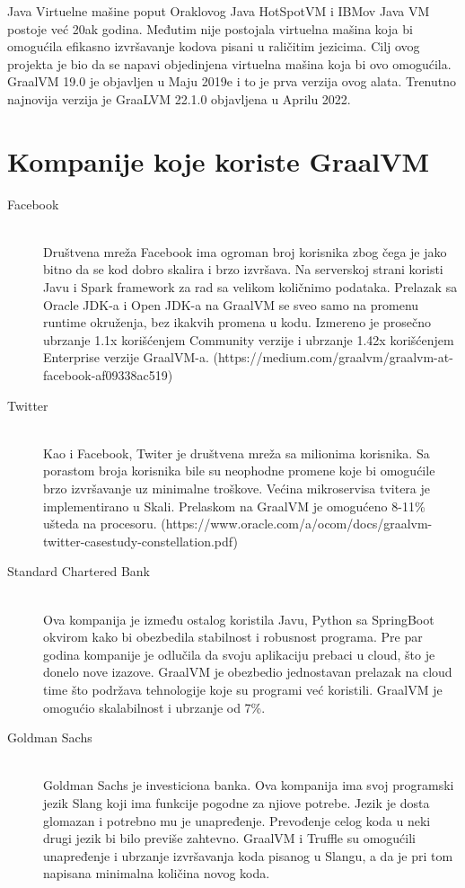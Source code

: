 \documentclass[a4paper]{article}
\begin{document}
Java Virtuelne mašine poput Oraklovog Java HotSpotVM i IBMov Java VM postoje već 20ak godina. Međutim nije postojala virtuelna mašina koja bi omogućila efikasno izvršavanje kodova pisani u raličitim jezicima. Cilj ovog projekta je bio da se napavi objedinjena virtuelna mašina koja bi ovo omogućila.\\

GraalVM 19.0 je objavljen u Maju 2019e i to je prva verzija ovog alata. Trenutno najnovija verzija je GraaLVM 22.1.0 objavljena u Aprilu 2022. 


\section{Kompanije koje koriste GraalVM}
\begin{description}
	\item[Facebook] \hfill \\
	Društvena mreža Facebook ima ogroman broj korisnika zbog čega je jako bitno da se kod dobro skalira i brzo izvršava.
	Na serverskoj strani koristi Javu i Spark framework za rad sa velikom količnimo podataka. Prelazak sa Oracle JDK-a i Open JDK-a na GraalVM se sveo samo na promenu runtime okruženja, bez ikakvih promena u kodu. Izmereno je prosečno ubrzanje 1.1x korišćenjem Community verzije i ubrzanje 1.42x korišćenjem Enterprise verzije GraalVM-a.  (https://medium.com/graalvm/graalvm-at-facebook-af09338ac519)
	
	\item[Twitter] \hfill \\
	Kao i Facebook, Twiter je društvena mreža sa milionima korisnika. Sa porastom broja korisnika bile su neophodne promene koje bi omogućile brzo izvršavanje uz minimalne troškove. Većina mikroservisa tvitera je implementirano u Skali. Prelaskom na GraalVM je omogućeno 8-11\% ušteda na procesoru. 
	(https://www.oracle.com/a/ocom/docs/graalvm-twitter-casestudy-constellation.pdf)
	
	\item[Standard Chartered Bank] \hfil \\
	Ova kompanija je između ostalog koristila Javu, Python sa SpringBoot okvirom kako bi obezbedila stabilnost i robusnost programa. Pre par godina kompanije je odlučila da svoju aplikaciju prebaci u cloud, što je donelo nove izazove. GraalVM je obezbedio jednostavan prelazak na cloud time što podržava tehnologije koje su programi već koristili. GraalVM je omogućio skalabilnost i ubrzanje od 7\%.
	
	\item[Goldman Sachs]  \hfil \\
	Goldman Sachs je investiciona banka. Ova kompanija ima svoj programski jezik Slang koji ima funkcije pogodne za njiove potrebe. Jezik je dosta glomazan i potrebno mu je unapređenje. Prevođenje celog koda u neki drugi jezik bi bilo previše zahtevno. GraalVM i Truffle su omogućili unapređenje i ubrzanje izvršavanja koda pisanog u Slangu, a da je pri tom napisana minimalna količina novog koda.
	

\end{description}
\end{document}

